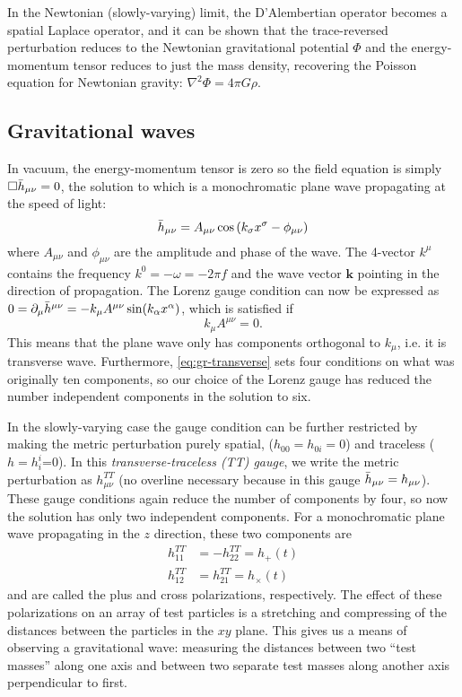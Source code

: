 In the Newtonian (slowly-varying) limit, the D'Alembertian operator becomes a spatial Laplace operator, and it can be shown that the trace-reversed perturbation reduces to the Newtonian gravitational potential $\Phi$ and the energy-momentum tensor reduces to just the mass density, recovering the Poisson equation for Newtonian gravity: $\nabla^2\Phi = 4\pi G\rho$.


\subsection{Gravitational waves}

In vacuum, the energy-momentum tensor is zero so the field equation is simply $\Box\Bar{h}_{\mu\nu}=0$, the solution to which is a monochromatic plane wave propagating at the speed of light:
\begin{equation}
	\Bar{h}_{\mu\nu} = A_{\mu\nu}\cos\left(k_\sigma x^\sigma - \phi_{\mu\nu}\right)
\end{equation}
where $A_{\mu\nu}$ and $\phi_{\mu\nu}$ are the amplitude and phase of the wave.
The 4-vector $k^{\mu}$ contains the frequency $k^0 = -\omega = -2\pi f$ and the wave vector $\mathbf{k}$ pointing in the direction of propagation.
The Lorenz gauge condition can now be expressed as $0 = \partial_{\mu} \Bar{h}^{\mu\nu} = -k_{\mu} A^{\mu\nu} \sin (k_{\alpha} x^{\alpha})$, which is satisfied if
\begin{equation}\label{eq:gr-transverse}
	k_{\mu} A^{\mu\nu} = 0.
\end{equation}
This means that the plane wave only has components orthogonal to $k_{\mu}$, i.e. it is transverse wave.
Furthermore, \cref{eq:gr-transverse} sets four conditions on what was originally ten components, so our choice of the Lorenz gauge has reduced the number independent components in the solution to six.

In the slowly-varying case the gauge condition can be further restricted by making the metric perturbation purely spatial, ($h_{00}=h_{0i}=0$) and traceless ($h=h_i^i$=0).
In this \textit{transverse-traceless (TT) gauge}, we write the metric perturbation as $h_{\mu\nu}^{TT}$ (no overline necessary because in this gauge $\Bar{h}_{\mu\nu} = h_{\mu\nu}$).
These gauge conditions again reduce the number of components by four, so now the solution has only two independent components.
For a monochromatic plane wave propagating in the $z$ direction, these two components are
\begin{align}
	h_{11}^{TT} &= -h_{22}^{TT} = h_+(t) \\
	h_{12}^{TT} &= h_{21}^{TT} = h_{\times}(t)
\end{align}
and are called the plus and cross polarizations, respectively.
The effect of these polarizations on an array of test particles is a stretching and compressing of the distances between the particles in the $xy$ plane.
This gives us a means of observing a gravitational wave:
measuring the distances between two ``test masses'' along one axis and between two separate test masses along another axis perpendicular to first.

